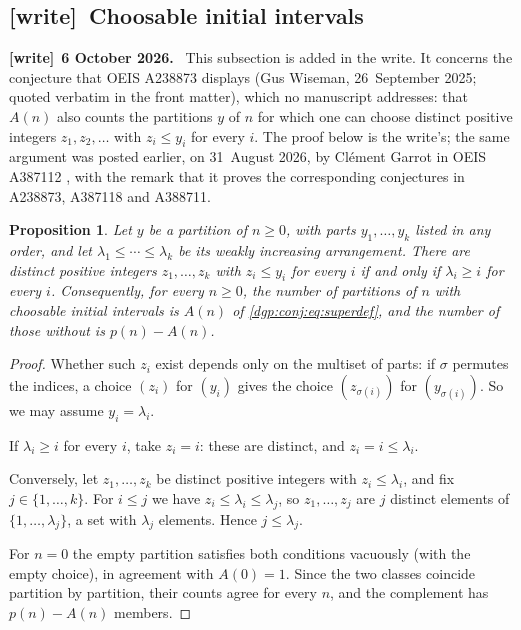 \documentclass[11pt,letterpaper]{article}
\numberwithin{equation}{section}
\newtheorem{proposition}[theorem]{Proposition}
\theoremstyle{remark}\newtheorem{remark}[theorem]{Remark}
\newenvironment{writenote}[1][]{\par\smallskip\begingroup\small
 \noindent\textbf{[write]}\if\relax\detokenize{#1}\relax\else~\textbf{#1.}\fi\ }%
 {\par\endgroup\smallskip}
\newcommand{\wtag}{\textup{\textbf{[write]}}}
\begin{document}
\subsection{\wtag\ Choosable initial intervals}\label{dgp:conj:sub:choosable}
\begin{writenote}[6 October 2026]
This subsection is added in the write. It concerns the conjecture that OEIS A238873 displays (Gus Wiseman, 26~September 2025; quoted verbatim in the front matter), which no manuscript addresses: that $A(n)$ also counts the partitions $y$ of $n$ for which one can choose distinct positive integers $z_1,z_2,\dots$ with $z_i\le y_i$ for every $i$. The proof below is the write's; the same argument was posted earlier, on 31~August 2026, by Clément Garrot in OEIS A387112 \cite{oeisA387112}, with the remark that it proves the corresponding conjectures in A238873, A387118 and A388711.
\end{writenote}
\begin{proposition}\label{dgp:conj:prop:choosable}
Let $y$ be a partition of $n\ge0$, with parts $y_1,\dots,y_k$ listed in any order, and let $\lambda_1\le\cdots\le\lambda_k$ be its weakly increasing arrangement. There are distinct positive integers $z_1,\dots,z_k$ with $z_i\le y_i$ for every $i$ if and only if $\lambda_i\ge i$ for every $i$. Consequently, for every $n\ge0$, the number of partitions of $n$ with choosable initial intervals is $A(n)$ of \eqref{dgp:conj:eq:superdef}, and the number of those without is $p(n)-A(n)$.
\end{proposition}
\begin{proof}
Whether such $z_i$ exist depends only on the multiset of parts: if $\sigma$ permutes the indices, a choice $(z_i)$ for $(y_i)$ gives the choice $(z_{\sigma(i)})$ for $(y_{\sigma(i)})$. So we may assume $y_i=\lambda_i$.

If $\lambda_i\ge i$ for every $i$, take $z_i=i$: these are distinct, and $z_i=i\le\lambda_i$.

Conversely, let $z_1,\dots,z_k$ be distinct positive integers with $z_i\le\lambda_i$, and fix $j\in\{1,\dots,k\}$. For $i\le j$ we have $z_i\le\lambda_i\le\lambda_j$, so $z_1,\dots,z_j$ are $j$ distinct elements of $\{1,\dots,\lambda_j\}$, a set with $\lambda_j$ elements. Hence $j\le\lambda_j$.

For $n=0$ the empty partition satisfies both conditions vacuously (with the empty choice), in agreement with $A(0)=1$. Since the two classes coincide partition by partition, their counts agree for every $n$, and the complement has $p(n)-A(n)$ members.
\end{proof}
\end{document}
